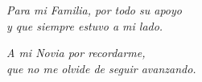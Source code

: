 \chapter*{}
\begin{flushright}
  \textit{Para mi Familia, por todo su apoyo} \\
  \textit{y que siempre estuvo a mi lado.}\\

\hfill \break

  \textit{A mi Novia por recordarme,}\\
  \textit{que no me olvide de seguir avanzando.}\\
\end{flushright}
